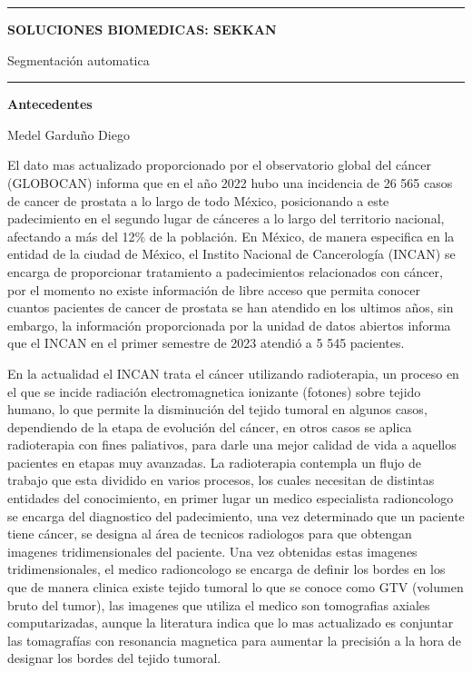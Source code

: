 \documentclass{article}
\begin{document}
\thispagestyle{plain}


\hrule
\begin{center}
    {\Large \textbf{SOLUCIONES BIOMEDICAS: SEKKAN}}
    \vspace{10pt}

    {\Large{{Segmentación automatica}}}
    
    
    \vspace{10pt}

    \hrule

    \vspace{20pt}


    {\Huge \textbf{Antecedentes}}\\
\end{center}

\hdashrule{\linewidth}{1pt}{1mm}

\begin{flushright}
    {\small Medel Garduño Diego} 
\end{flushright}


El dato mas actualizado proporcionado por el observatorio global del cáncer (GLOBOCAN) informa que en el año 2022 hubo una incidencia de 26 565 casos de cancer de prostata a lo largo de todo México, posicionando a este padecimiento en el segundo lugar de cánceres a lo largo del territorio nacional, afectando a más del 12$\%$ de la población. En México, de manera especifica en la entidad de la ciudad de México, el Instito Nacional de Cancerología (INCAN) se encarga de proporcionar tratamiento a padecimientos relacionados con cáncer, por el momento no existe información de libre acceso que permita conocer cuantos pacientes de cancer de prostata se han atendido en los ultimos años, sin embargo, la información proporcionada por la unidad de datos abiertos informa que el INCAN en el primer semestre de 2023 atendió a 5 545 pacientes.


\vspace{10pt}

En la actualidad el INCAN trata el cáncer utilizando radioterapia, un proceso en el que se incide radiación electromagnetica ionizante (fotones) sobre tejido humano, lo que permite la disminución del tejido tumoral en algunos casos, dependiendo de la etapa de evolución del cáncer, en otros casos se aplica radioterapia con fines paliativos, para darle una mejor calidad de vida a aquellos pacientes en etapas muy avanzadas. La radioterapia contempla un flujo de trabajo que esta dividido en varios procesos, los cuales necesitan de distintas entidades del conocimiento, en primer lugar un medico especialista radioncologo se encarga del diagnostico del padecimiento, una vez determinado que un paciente tiene cáncer, se designa al área de tecnicos radiologos para que obtengan imagenes tridimensionales del paciente. Una vez obtenidas estas imagenes tridimensionales, el medico radioncologo se encarga de definir los bordes en los que de manera clinica existe tejido tumoral lo que se conoce como GTV (volumen bruto del tumor), las imagenes que utiliza el medico son tomografias axiales computarizadas, aunque la literatura indica que lo mas actualizado es conjuntar las tomagrafías con resonancia magnetica para aumentar la precisión a la hora de  designar los bordes del tejido tumoral. 
\end{document}
